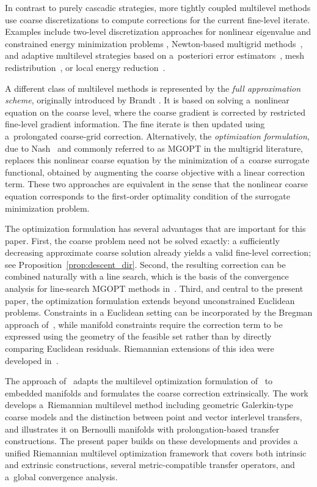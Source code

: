 \documentclass[11pt,reqno]{amsart}
\theoremstyle{plain}
\begin{document}
	In contrast to purely cascadic strategies, more tightly coupled multilevel
	methods use coarse discretizations to compute corrections for the current
	fine-level iterate. Examples include two-level discretization approaches 
	for nonlinear eigenvalue and constrained energy minimization problems
	\mbox{\cite{CanCHM18,CanDMSV16,GriH25,HenMP14}}, Newton-based multigrid
	methods~\cite{XuXXF21}, and adaptive multilevel strategies based on a~posteriori error estimators~\cite{ChenDGHZ14,wang2023posteriori}, mesh
	redistribution~\cite{XieXYZ23}, or local energy reduction~\cite{HeidW25}.
	
	A different class of multilevel methods is represented by the \emph{full approximation scheme}, originally introduced by Brandt \cite{Brandt1977}. It is based on solving a~nonlinear equation on the coarse level, where the coarse gradient is corrected by restricted fine-level gradient information. The fine iterate is then updated using a~prolongated coarse-grid correction. Alternatively, the \emph{optimization formulation}, due to Nash~\cite{Nash:2000}
	and commonly referred to as MGOPT in the multigrid literature, replaces this nonlinear coarse equation by the minimization of a~coarse surrogate functional, obtained by augmenting the coarse objective with a linear correction term. These two approaches are equivalent in the sense that the nonlinear coarse equation corresponds to the first-order optimality condition of the surrogate minimization problem.
	
	The optimization formulation has several advantages that are important for this
	paper. First, the coarse problem need not be solved exactly: a sufficiently
	decreasing approximate coarse solution already yields a valid fine-level
	correction; see Proposition~\ref{prop:descent_dir}. Second, the resulting
	correction can be combined naturally with a line search, which is the basis of
	the convergence analysis for line-search MGOPT methods in~\cite{WenGoldfarb2010}.
	Third, and central to the present paper, the optimization formulation extends beyond unconstrained Euclidean problems. Constraints in a Euclidean setting can be incorporated by the Bregman approach of~\cite{ElshiatyP2026}, while manifold constraints require the correction term to be expressed using the geometry of the feasible set rather than by directly comparing Euclidean residuals. Riemannian extensions of this idea were developed in~\cite{MuePZ23,SutV2021}.
	
	The approach of~\cite{SutV2021} adapts 
	the multilevel optimization formulation of~\cite{Nash:2000} to embedded manifolds and formulates the coarse correction extrinsically. 
	The work~\cite{MuePZ23} develops a~Riemannian multilevel method
	including geometric Galerkin-type coarse models and the distinction between point and vector interlevel transfers, and illustrates it on Bernoulli manifolds with prolongation-based transfer constructions.
	The present paper builds on these developments and provides a unified Riemannian multilevel optimization framework that covers both intrinsic and extrinsic constructions, several metric-compatible transfer operators, and a~global convergence analysis.
	
\end{document}
